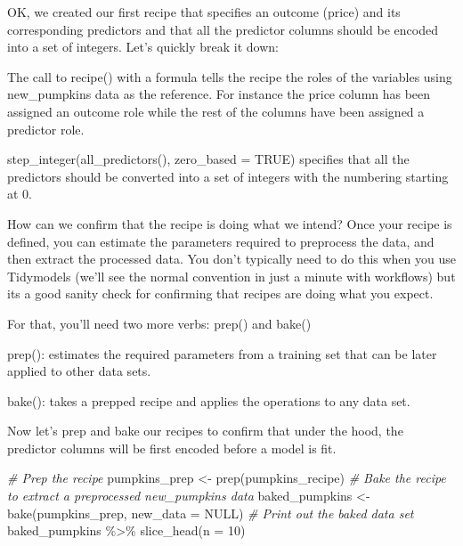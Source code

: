 \documentclass[
]{article}
\newenvironment{Shaded}{\begin{snugshade}}{\end{snugshade}}
\newcommand{\AttributeTok}[1]{\textcolor[rgb]{0.77,0.63,0.00}{#1}}
\newcommand{\CommentTok}[1]{\textcolor[rgb]{0.56,0.35,0.01}{\textit{#1}}}
\newcommand{\ConstantTok}[1]{\textcolor[rgb]{0.00,0.00,0.00}{#1}}
\newcommand{\DecValTok}[1]{\textcolor[rgb]{0.00,0.00,0.81}{#1}}
\newcommand{\FunctionTok}[1]{\textcolor[rgb]{0.00,0.00,0.00}{#1}}
\newcommand{\NormalTok}[1]{#1}
\newcommand{\OtherTok}[1]{\textcolor[rgb]{0.56,0.35,0.01}{#1}}
\newcommand{\SpecialCharTok}[1]{\textcolor[rgb]{0.00,0.00,0.00}{#1}}
\begin{document}
OK, we created our first recipe that specifies an outcome (price) and
its corresponding predictors and that all the predictor columns should
be encoded into a set of integers. Let's quickly break it down:

The call to recipe() with a formula tells the recipe the roles of the
variables using new\_pumpkins data as the reference. For instance the
price column has been assigned an outcome role while the rest of the
columns have been assigned a predictor role.

step\_integer(all\_predictors(), zero\_based = TRUE) specifies that all
the predictors should be converted into a set of integers with the
numbering starting at 0.

How can we confirm that the recipe is doing what we intend? Once your
recipe is defined, you can estimate the parameters required to
preprocess the data, and then extract the processed data. You don't
typically need to do this when you use Tidymodels (we'll see the normal
convention in just a minute with workflows) but its a good sanity check
for confirming that recipes are doing what you expect.

For that, you'll need two more verbs: prep() and bake()

prep(): estimates the required parameters from a training set that can
be later applied to other data sets.

bake(): takes a prepped recipe and applies the operations to any data
set.

Now let's prep and bake our recipes to confirm that under the hood, the
predictor columns will be first encoded before a model is fit.

\begin{Shaded}
\begin{Highlighting}[]
\CommentTok{\# Prep the recipe}
\NormalTok{pumpkins\_prep }\OtherTok{\textless{}{-}} \FunctionTok{prep}\NormalTok{(pumpkins\_recipe)}
\CommentTok{\# Bake the recipe to extract a preprocessed new\_pumpkins data}
\NormalTok{baked\_pumpkins }\OtherTok{\textless{}{-}} \FunctionTok{bake}\NormalTok{(pumpkins\_prep, }\AttributeTok{new\_data =} \ConstantTok{NULL}\NormalTok{)}
\CommentTok{\# Print out the baked data set}
\NormalTok{baked\_pumpkins }\SpecialCharTok{\%\textgreater{}\%} 
  \FunctionTok{slice\_head}\NormalTok{(}\AttributeTok{n =} \DecValTok{10}\NormalTok{)}
\end{Highlighting}
\end{Shaded}
\end{document}

